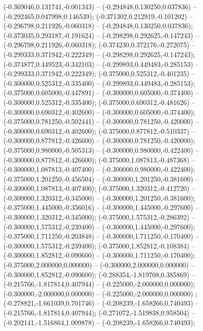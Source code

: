  (-0.369046,0.131741,-0.001343) -- (-0.294848,0.130250,0.037836) -- (-0.292465,0.047998,0.146539);
 (-0.371302,0.212919,-0.101202) -- (-0.296798,0.211926,-0.060318) -- (-0.294848,0.130250,0.037836);
 (-0.373035,0.293187,-0.191624) -- (-0.298298,0.292625,-0.147243) -- (-0.296798,0.211926,-0.060318);
 (-0.374230,0.372176,-0.272075) -- (-0.299333,0.371942,-0.222349) -- (-0.298298,0.292625,-0.147243);
 (-0.374877,0.449523,-0.342103) -- (-0.299893,0.449483,-0.285153) -- (-0.299333,0.371942,-0.222349);
 (-0.375000,0.525312,-0.401235) -- (-0.300000,0.525312,-0.335400) -- (-0.299893,0.449483,-0.285153);
 (-0.375000,0.605000,-0.447891) -- (-0.300000,0.605000,-0.374400) -- (-0.300000,0.525312,-0.335400);
 (-0.375000,0.690312,-0.481626) -- (-0.300000,0.690312,-0.402600) -- (-0.300000,0.605000,-0.374400);
 (-0.375000,0.781250,-0.502441) -- (-0.300000,0.781250,-0.420000) -- (-0.300000,0.690312,-0.402600);
 (-0.375000,0.877812,-0.510337) -- (-0.300000,0.877812,-0.426600) -- (-0.300000,0.781250,-0.420000);
 (-0.375000,0.980000,-0.505313) -- (-0.300000,0.980000,-0.422400) -- (-0.300000,0.877812,-0.426600);
 (-0.375000,1.087813,-0.487368) -- (-0.300000,1.087813,-0.407400) -- (-0.300000,0.980000,-0.422400);
 (-0.375000,1.201250,-0.456504) -- (-0.300000,1.201250,-0.381600) -- (-0.300000,1.087813,-0.407400);
 (-0.375000,1.320312,-0.412720) -- (-0.300000,1.320312,-0.345000) -- (-0.300000,1.201250,-0.381600);
 (-0.375000,1.445000,-0.356016) -- (-0.300000,1.445000,-0.297600) -- (-0.300000,1.320312,-0.345000);
 (-0.375000,1.575312,-0.286392) -- (-0.300000,1.575312,-0.239400) -- (-0.300000,1.445000,-0.297600);
 (-0.375000,1.711250,-0.203848) -- (-0.300000,1.711250,-0.170400) -- (-0.300000,1.575312,-0.239400);
 (-0.375000,1.852812,-0.108384) -- (-0.300000,1.852812,-0.090600) -- (-0.300000,1.711250,-0.170400);
 (-0.375000,2.000000,0.000000) -- (-0.300000,2.000000,0.000000) -- (-0.300000,1.852812,-0.090600);
 (-0.288354,-1.819708,0.385869) -- (-0.215766,-1.817814,0.407944) -- (-0.225000,-2.000000,0.000000);
 (-0.300000,-2.000000,0.000000) -- (-0.225000,-2.000000,0.000000) ;
 (-0.278821,-1.661039,0.701746) -- (-0.208239,-1.658266,0.740493) -- (-0.215766,-1.817814,0.407944);
 (-0.271072,-1.519838,0.958504) -- (-0.202141,-1.516864,1.009878) -- (-0.208239,-1.658266,0.740493);
